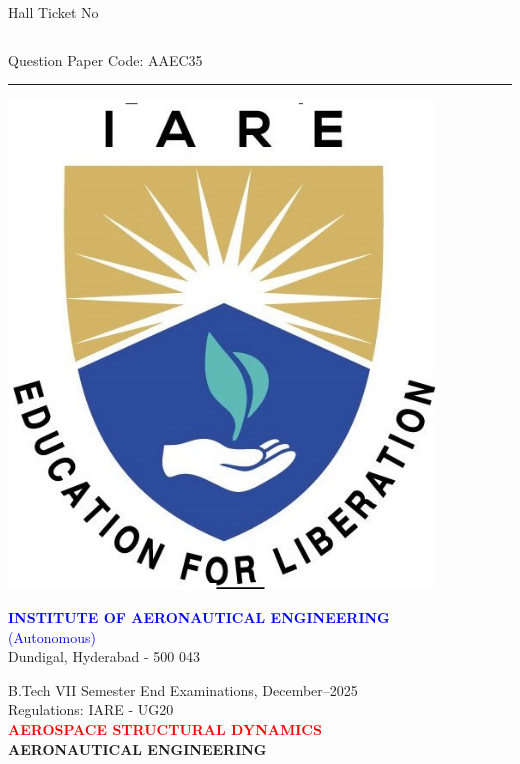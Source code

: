 \documentclass[11pt,paper=a4,answers]{exam}
\begin{document}
	\setlength{\tabcolsep}{10pt}
\renewcommand{\arraystretch}{1.5}
Hall Ticket No 
\begin{tabular}{|c| c| c| c| c| c|c| c| c| c|} \hline
	& & &&&&&&&\\ [0.5ex]\hline
\end{tabular}
\hfill Question Paper Code: AAEC35
\vspace{5pt}\hrule
\vspace{5pt}

\begin{minipage}{0.15\linewidth}%
	\flushleft
	\includegraphics[width=0.85\textwidth]{iare.png}\end{minipage}
\begin{minipage}[r]{0.85\textwidth}%
	\noindent
	\begin{center}	
	\textcolor{blue}{\Large \bfseries INSTITUTE OF AERONAUTICAL ENGINEERING}\\
	\textcolor{blue}{\large (Autonomous)} \\
	\small Dundigal, Hyderabad - 500 043 \\  [3pt] 
	 \par \vspace{3pt}
	B.Tech VII Semester End Examinations, December–2025 \\ \vspace{3pt}
	Regulations: IARE - UG20 \\\vspace{3pt}
	\textcolor{red}{\large \bfseries AEROSPACE STRUCTURAL DYNAMICS } \\\vspace{3pt}
	\large \bfseries AERONAUTICAL ENGINEERING
\end{center}
\end{minipage}
\end{document}
